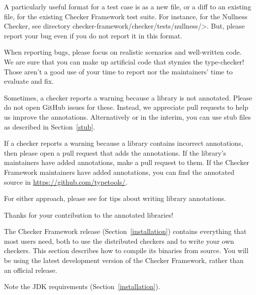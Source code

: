 A particularly useful format for a test case is as a new file, or a diff to
an existing file, for the existing Checker Framework test suite.  For
instance, for the Nullness
Checker, see directory \<checker-framework/checker/tests/nullness/>.
But, please report your bug even if you do not report it in this format.

When reporting bugs, please focus on realistic scenarios and well-written
code.  We are sure that you can make up artificial code that stymies the
type-checker!  Those aren't a good use of your time to report nor the
maintainers' time to evaluate and fix.



Sometimes, a checker reports a warning because a library is not
annotated.  Please do not open GitHub issues for these.
Instead, we appreciate pull requests to help us improve the annotations.
Alternatively or in the interim, you can use stub files as described in
Section~\ref{stub}.

If a checker reports a warning because a library contains incorrect annotations,
then please open a pull request that adds the annotations.  If the
library's maintainers have added annotations, make a pull request to them.
If the Checker Framework maintainers have added annotations,
you can find the annotated source in \url{https://github.com/typetools/}.

For either approach, please see  for
tips about writing library annotations.

Thanks for your contribution to the annotated libraries!



The Checker Framework release (Section~\ref{installation}) contains
everything that most users need, both to use the distributed checkers and
to write your own checkers.  This section describes how to compile its
binaries from source.  You will be using the latest development version of
the Checker Framework, rather than an official release.


Note the JDK requirements (Section~\ref{installation}).



